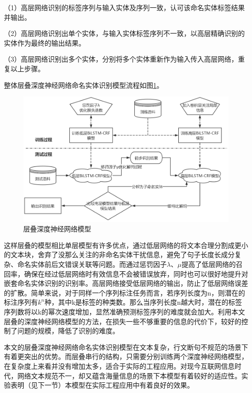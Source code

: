 \documentclass[winfonts,master,oneside,nobackinfo]{njuthesis}
\begin{document}
（1）高层网络识别的标签序列与输入实体及序列一致，认可该命名实体标签结果并输出。

（2）高层网络识别出单个实体，与输入实体标签序列不一致，以高层精确识别的实体作为最终的输出结果。

（3）高层网络识别出多个实体，分别将多个实体重新作为输入传入高层网络，重复以上步骤。

整体层叠深度神经网络命名实体识别模型流程如图\ref{high-low}。

\begin{figure}[h]
\centering
\includegraphics[width=1\textwidth]{./figure/层叠模型流程.jpg}
\caption{层叠深度神经网络模型}
\label{high-low}
\end{figure}

这样层叠的模型相比单层模型有许多优点，通过低层网络的将文本合理分割成更小的文本块，舍弃了没那么关注的非命名实体干扰信息，避免了句子长度长成分复杂、命名实体前后文错误关联等问题。而通过惩罚因子$\lambda$、$\mu$提高了低层网络的召回率，确保在经过低层网络时有效信息不会被错误放弃，同时也可以很好地提升对嵌套命名实体识别的识别率。高层网络接受低层网络的输出，防止了低层网络误差的扩散。简单来说，对于同样一个序列标注任务而言，若序列长度为n，则潜在的标注序列有$k^n$种，其中k是标签的种类数。那么当序列长度n越大时，潜在的标签序列数将以k的幂次速度增加，显然准确预测标签序列的难度就会加大。利用本文层叠的深度神经网络模型的方法，在损失一些不够重要的信息的代价下，较好的控制了问题的规模，降低了识别的难度。

本文的层叠深度神经网络命名实体识别模型在文本复杂，行文断句不规范的场景下有着更突出的优势。而层叠串行的结构，只需要分别训练两个深度神经网络模型，在复杂度上来看并没有增加太多，适合于实际的工程应用。对现今互联网信息时代，网络文本规范不一，却又蕴含海量信息的场景下本模型有着较好的适应性。实验表明（见下一节）本模型在实际工程应用中有着良好的效果。
\end{document}
